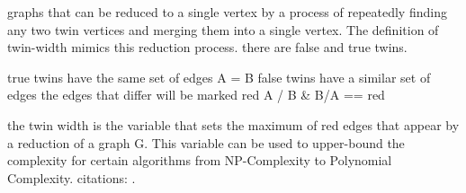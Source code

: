 \documentclass[acmsmall,review]{acmart}
\begin{document}
graphs that can be reduced to a single vertex by a process of repeatedly finding any two twin vertices and merging them into a single vertex. The definition of twin-width mimics this reduction process.
there are false and true twins.

true twins have the same set of edges A = B
 false twins have a similar set of edges the edges that differ will be marked red  {A / B  \& B/A} == red

 the twin width is the variable that sets the maximum of red edges that appear by a reduction of a graph G. This variable can be used to upper-bound the complexity for certain algorithms from NP-Complexity to Polynomial Complexity.
 citations: \cite{bonnet2021twini} \cite{bonnet2021twinii}.



\end{document}
